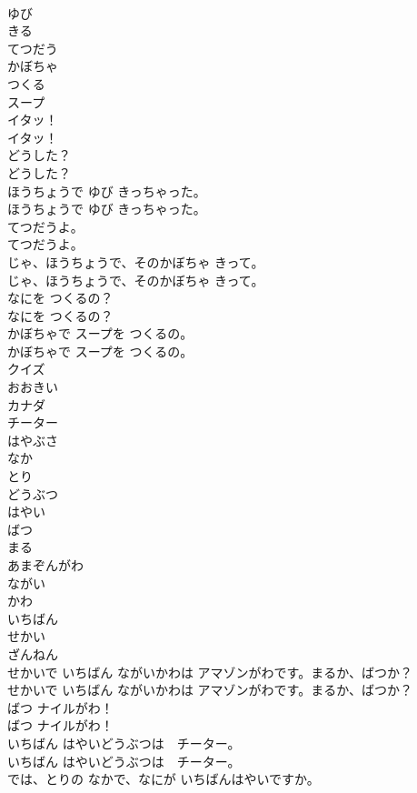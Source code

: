 \documentclass[8pt]{extreport}
\begin{document}
\begin{CJK}{UTF8}{min}
\\	ゆび
\\	きる
\\	てつだう
\\	かぼちゃ
\\	つくる
\\	スープ
\\	イタッ！	
\\	イタッ！ 
\\	どうした？	
\\	どうした？ 
\\	ほうちょうで ゆび きっちゃった。	
\\	ほうちょうで ゆび きっちゃった。 
\\	てつだうよ。	
\\	てつだうよ。 
\\	じゃ、ほうちょうで、そのかぼちゃ きって。	
\\	じゃ、ほうちょうで、そのかぼちゃ きって。 
\\	なにを つくるの？	
\\	なにを つくるの？ 
\\	かぼちゃで スープを つくるの。	
\\	かぼちゃで スープを つくるの。 
\\	クイズ
\\	おおきい
\\	カナダ
\\	チーター
\\	はやぶさ
\\	なか
\\	とり
\\	どうぶつ
\\	はやい
\\	ばつ
\\	まる
\\	あまぞんがわ
\\	ながい
\\	かわ
\\	いちばん
\\	せかい
\\	ざんねん
\\	せかいで いちばん ながいかわは アマゾンがわです。まるか、ばつか？	
\\	せかいで いちばん ながいかわは アマゾンがわです。まるか、ばつか？ 
\\	ばつ ナイルがわ！	
\\	ばつ ナイルがわ！ 
\\	いちばん はやいどうぶつは　チーター。	
\\	いちばん はやいどうぶつは　チーター。 
\\	では、とりの なかで、なにが いちばんはやいですか。	

\end{CJK}
\end{document}
